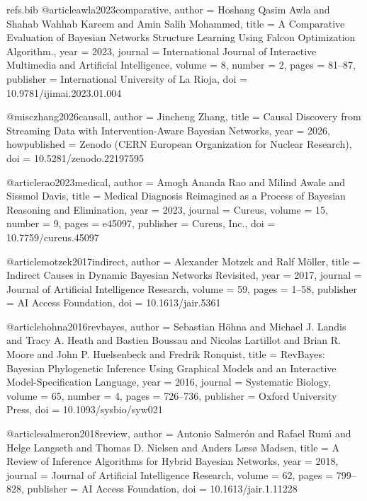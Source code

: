 \begin{filecontents*}[overwrite]{refs.bib}
@article{awla2023comparative,
  author = {Hoshang Qasim Awla and Shahab Wahhab Kareem and Amin Salih Mohammed},
  title = {{A Comparative Evaluation of Bayesian Networks Structure Learning Using Falcon Optimization Algorithm.}},
  year = {2023},
  journal = {International Journal of Interactive Multimedia and Artificial Intelligence},
  volume = {8},
  number = {2},
  pages = {81--87},
  publisher = {International University of La Rioja},
  doi = {10.9781/ijimai.2023.01.004}
}

@misc{zhang2026causall,
  author = {Jincheng Zhang},
  title = {{Causal Discovery from Streaming Data with Intervention-Aware Bayesian Networks}},
  year = {2026},
  howpublished = {Zenodo (CERN European Organization for Nuclear Research)},
  doi = {10.5281/zenodo.22197595}
}

@article{rao2023medical,
  author = {Amogh Ananda Rao and Milind Awale and Sissmol Davis},
  title = {{Medical Diagnosis Reimagined as a Process of Bayesian Reasoning and Elimination}},
  year = {2023},
  journal = {Cureus},
  volume = {15},
  number = {9},
  pages = {e45097},
  publisher = {Cureus, Inc.},
  doi = {10.7759/cureus.45097}
}

@article{motzek2017indirect,
  author = {Alexander Motzek and Ralf M{\"o}ller},
  title = {{Indirect Causes in Dynamic Bayesian Networks Revisited}},
  year = {2017},
  journal = {Journal of Artificial Intelligence Research},
  volume = {59},
  pages = {1--58},
  publisher = {AI Access Foundation},
  doi = {10.1613/jair.5361}
}

@article{hohna2016revbayes,
  author = {Sebastian H{\"o}hna and Michael J. Landis and Tracy A. Heath and Bastien Boussau and Nicolas Lartillot and Brian R. Moore and John P. Huelsenbeck and Fredrik Ronquist},
  title = {{RevBayes: Bayesian Phylogenetic Inference Using Graphical Models and an Interactive Model-Specification Language}},
  year = {2016},
  journal = {Systematic Biology},
  volume = {65},
  number = {4},
  pages = {726--736},
  publisher = {Oxford University Press},
  doi = {10.1093/sysbio/syw021}
}

@article{salmeron2018review,
  author = {Antonio Salmer{\'o}n and Rafael Rum{\'\i} and Helge Langseth and Thomas D. Nielsen and Anders L{\ae}s{\o} Madsen},
  title = {{A Review of Inference Algorithms for Hybrid Bayesian Networks}},
  year = {2018},
  journal = {Journal of Artificial Intelligence Research},
  volume = {62},
  pages = {799--828},
  publisher = {AI Access Foundation},
  doi = {10.1613/jair.1.11228}
}


\end{filecontents*}
